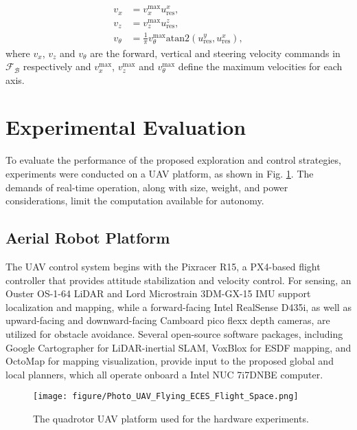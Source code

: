 \documentclass[letterpaper, 10 pt, conference]{ieeeconf}  %
\begin{document}
\begin{align}
    \label{eq:uav_vel_cmds}
    v_x &= v_x^{\max} u_{\text{res}}^x, \nonumber \\
    v_z &= v_z^{\max} u_{\text{res}}^z, \nonumber \\
    v_{\theta} &= \frac{1}{\pi} v_{\theta}^{\max} \text{atan2} (u_{\text{res}}^y,u_{\text{res}}^x),
\end{align}
where $v_x$, $v_z$ and $v_{\theta}$ are the forward, vertical and steering velocity commands in $\mathcal{F}_\mathcal{B}$ respectively and $v_x^{\max}$, $v_z^{\max}$ and $v_{\theta}^{\max}$ define the maximum velocities for each axis.

\section{Experimental Evaluation}
\label{sec:experimental_evaluation}

To evaluate the performance of the proposed exploration and control strategies, experiments were conducted on a UAV platform, as shown in Fig. \ref{fig:Photo_UAV}. The demands of real-time operation, along with size, weight, and power considerations, limit the computation available for autonomy.

\subsection{Aerial Robot Platform}

The UAV control system begins with the Pixracer R15, a PX4-based flight controller that provides attitude stabilization and velocity control. For sensing, an Ouster OS-1-64 LiDAR and Lord Microstrain 3DM-GX-15 IMU support localization and mapping, while a forward-facing Intel RealSense D435i, as well as upward-facing and downward-facing Camboard pico flexx depth cameras, are utilized for obstacle avoidance. Several open-source software packages, including Google Cartographer \cite{hess2016} for LiDAR-inertial SLAM, VoxBlox \cite{oleynikova2017voxblox} for ESDF mapping, and OctoMap \cite{hornung13octomap} for mapping visualization, provide input to the proposed global and local planners, which all operate onboard a Intel NUC 7i7DNBE computer.


\begin{figure}[h!]
		\centering
		{{\texttt{[image: figure/Photo\_UAV\_Flying\_ECES\_Flight\_Space.png]}\label{fig:UAV_ASPEN_Trajectory_2}}}
		\caption{The quadrotor UAV platform used for the hardware experiments.}
		\label{fig:Photo_UAV}
\end{figure}
\end{document}
